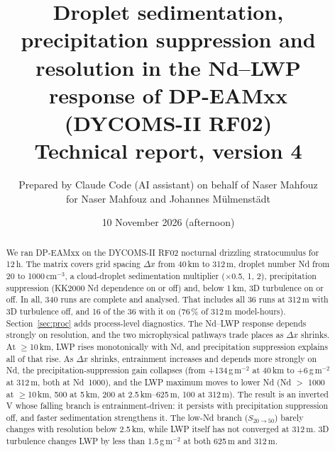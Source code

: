 \documentclass[10pt]{article}
\title{\bfseries Droplet sedimentation, precipitation suppression and resolution in the Nd--LWP response of DP-EAMxx (DYCOMS-II RF02)\\[4pt]\large Technical report, version 4}
\author{Prepared by Claude Code (AI assistant) on behalf of Naser Mahfouz\\ for Naser Mahfouz and Johannes M\"ulmenst\"adt}
\date{10 November 2026 (afternoon)}
\begin{document}
\sloppy
\maketitle

\begin{abstract}\noindent
We ran DP-EAMxx on the DYCOMS-II RF02 nocturnal drizzling stratocumulus for 12\,h. The matrix covers grid spacing $\Delta x$ from 40\,km to 312\,m,
droplet number Nd from 20 to 1000\,cm$^{-3}$, a cloud-droplet sedimentation multiplier ($\times$0.5, 1, 2), precipitation suppression
(KK2000 Nd dependence on or off) and, below 1\,km, 3D turbulence on or off. In all, 340 runs are complete and analysed. That includes all 36 runs at 312\,m with 3D turbulence off, and 16 of the 36 with it on (76\,\% of 312\,m model-hours). Section~\ref{sec:proc} adds process-level diagnostics.
The Nd--LWP response depends strongly on resolution, and the two microphysical pathways trade places as $\Delta x$ shrinks.
At $\geq$10\,km, LWP rises monotonically with Nd, and precipitation suppression explains all of that rise.
As $\Delta x$ shrinks, entrainment increases and depends more strongly on Nd, the precipitation-suppression gain collapses
(from +134\,g\,m$^{-2}$ at 40\,km to +6\,g\,m$^{-2}$ at 312\,m, both at Nd~1000), and the LWP maximum moves to lower Nd
(Nd $>$ 1000 at $\geq$10\,km, 500 at 5\,km, 200 at 2.5\,km--625\,m, 100 at 312\,m). The result is an inverted V whose falling branch is
entrainment-driven: it persists with precipitation suppression off, and faster sedimentation strengthens it. The low-Nd branch ($S_{20\to50}$) barely changes with
resolution below 2.5\,km, while LWP itself has not converged at 312\,m. 3D turbulence changes LWP by less than 1.5\,g\,m$^{-2}$ at both 625\,m and 312\,m.
\end{abstract}
\end{document}
